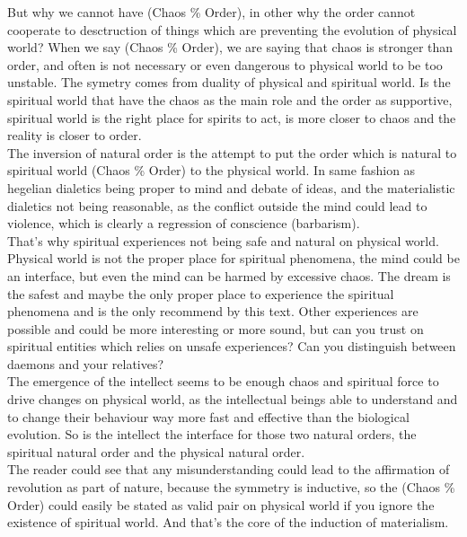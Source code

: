 \documentclass[12pt,a4paper]{article}
\begin{document}
But why we cannot have (Chaos \% Order), in other why the order cannot cooperate to desctruction of things which are preventing the evolution of physical world? When we say (Chaos \% Order), we are saying that chaos is stronger than order, and often is not necessary or even dangerous to physical world to be too unstable. The symetry comes from duality of physical and spiritual world. Is the spiritual world that have the chaos as the main role and the order as supportive, spiritual world is the right place for spirits to act, is more closer to chaos and the reality is closer to order.\\

The inversion of natural order is the attempt to put the order which is natural to spiritual world (Chaos \% Order) to the physical world. In same fashion as hegelian dialetics being proper to mind and debate of ideas, and the materialistic dialetics not being reasonable, as the conflict outside the mind could lead to violence, which is clearly a regression of conscience (barbarism).\\

That's why spiritual experiences not being safe and natural on physical world. Physical world is not the proper place for spiritual phenomena, the mind could be an interface, but even the mind can be harmed by excessive chaos. The dream is the safest and maybe the only proper place to experience the spiritual phenomena and is the only recommend by this text. Other experiences are possible and could be more interesting or more sound, but can you trust on spiritual entities which relies on unsafe experiences? Can you distinguish between daemons and your relatives?\\

The emergence of the intellect seems to be enough chaos and spiritual force to drive changes on physical world, as the intellectual beings able to understand and to change their behaviour way more fast and effective than the biological evolution. So is the intellect the interface for those two natural orders, the spiritual natural order and the physical natural order.\\

The reader could see that any misunderstanding could lead to the affirmation of revolution as part of nature, because the symmetry is inductive, so the (Chaos \% Order) could easily be stated as valid pair on physical world if you ignore the existence of spiritual world. And that's the core of the induction of materialism.\\
\end{document}
